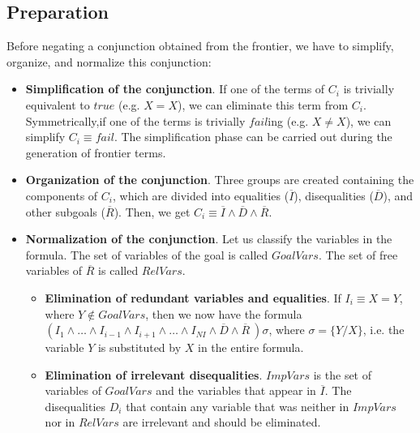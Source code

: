\documentclass{llncs}
\begin{document}

\subsection{Preparation}
\label{preparation}


Before negating a conjunction obtained from the frontier, we have to
simplify, organize, and normalize this conjunction:

\begin{itemize}

\item {\bf Simplification of the conjunction}. If one of the terms of
$C_i$ is trivially equivalent to $true$ (e.g. $X=X$), we can eliminate
this term from $C_i$. Symmetrically,if one of the terms is trivially
$fail$ing (e.g. $X \neq X$), we can simplify $C_i \equiv fail$. The
simplification phase can be carried out during the generation of
frontier terms.

\item {\bf Organization of the conjunction}. Three groups are created containing the components of $C_i$, which are divided into equalities ($\overline{I}$), 
disequalities ($\overline{D}$), and other subgoals ($\overline{R}$). 
Then, we get $C_i \equiv \overline{I}
\wedge \overline{D} \wedge \overline{R}$.
  
\item {\bf Normalization of the conjunction}. Let us classify the
variables in the formula. The set of variables of the
goal is called $GoalVars$. The set of free variables of $\overline{R}$
is called $RelVars$.

    \begin{itemize}


       \item {\bf Elimination of redundant variables and
       equalities}. If $I_i \equiv X = Y$, where $Y \not\in GoalVars$,
       then we now have the formula $ ( I_1 \wedge \ldots \wedge
       I_{i-1} \wedge I_{i+1} \wedge \ldots \wedge I_{NI} \wedge
       \overline{D} \wedge \overline{R}~) \sigma $, where $ \sigma = \{
       Y / X \}$, i.e. the variable $Y$ is substituted by $X$ in the
       entire formula. 
       \item {\bf Elimination of irrelevant disequalities}. $ImpVars$
       is the set of variables of $GoalVars$ and the variables that
       appear in $\overline{I}$. The disequalities $D_i$ that contain
       any variable that was neither in $ImpVars$ nor in $RelVars$ are
       irrelevant and should be eliminated.

    \end{itemize}

 \end{itemize}
\end{document}
